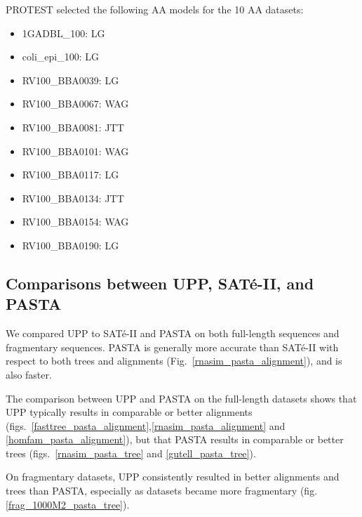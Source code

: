 PROTEST selected the following AA models for the 10 AA datasets:
\begin{itemize}
\item 1GADBL\_100: LG
\item coli\_epi\_100: LG
\item RV100\_BBA0039: LG
\item RV100\_BBA0067: WAG
\item RV100\_BBA0081: JTT
\item RV100\_BBA0101: WAG
\item RV100\_BBA0117: LG
\item RV100\_BBA0134: JTT
\item RV100\_BBA0154: WAG
\item RV100\_BBA0190: LG
\end{itemize}

\clearpage
\subsection{Comparisons between UPP, SAT\'e-II, and PASTA}\label{sec:som-upp-vs-pasta}
We compared UPP to SAT\'e-II and PASTA on both full-length 
sequences and fragmentary sequences.  
PASTA is generally more accurate than  SAT\'e-II with respect to both trees and alignments (Fig.~\ref{rnasim_pasta_alignment}), and is also faster.

The comparison between UPP and PASTA on
the full-length datasets shows that UPP typically results in 
comparable  or better alignments (figs.~\ref{fasttree_pasta_alignment},\ref{rnasim_pasta_alignment}
and \ref{homfam_pasta_alignment}), but that PASTA results in comparable or better trees (figs.~\ref{rnasim_pasta_tree} and \ref{gutell_pasta_tree}).


On fragmentary datasets, UPP consistently resulted in better alignments and trees than PASTA, especially as datasets became more fragmentary (fig. \ref{frag_1000M2_pasta_tree}).  



